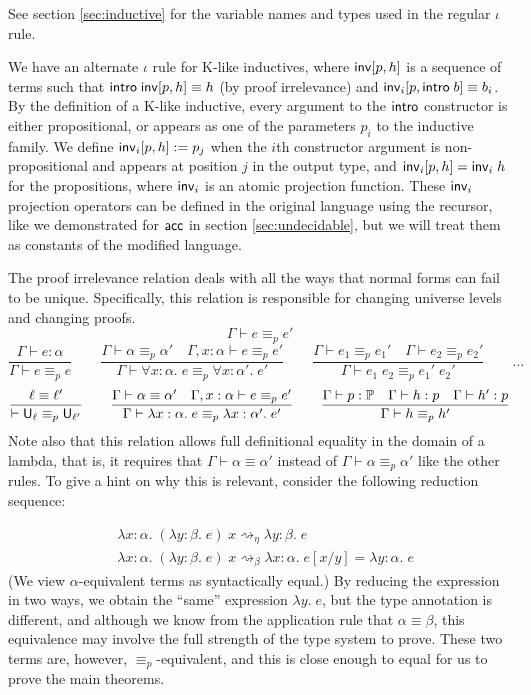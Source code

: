 See section \ref{sec:inductive} for the variable names and types used in the regular $\iota$ rule.

We have an alternate $\iota$ rule for K-like inductives, where $\mathsf{inv}[p,h]$ is a sequence of terms such that $\mathsf{intro}\;\mathsf{inv}[p,h]\equiv h$ (by proof irrelevance) and $\mathsf{inv}_i[p,\mathsf{intro}\;b]\equiv b_i$. By the definition of a K-like inductive, every argument to the $\mathsf{intro}$ constructor is either propositional, or appears as one of the parameters $p_i$ to the inductive family. We define $\mathsf{inv}_i[p,h]:=p_j$ when the $i$th constructor argument is non-propositional and appears at position $j$ in the output type, and $\mathsf{inv}_i[p,h]=\mathsf{inv}_i\;h$ for the propositions, where $\mathsf{inv}_i$ is an atomic projection function. These $\mathsf{inv}_i$ projection operators can be defined in the original language using the recursor, like we demonstrated for $\mathsf{acc}$ in section \ref{sec:undecidable}, but we will treat them as constants of the modified language.

The proof irrelevance relation deals with all the ways that normal forms can fail to be unique. Specifically, this relation is responsible for changing universe levels and changing proofs.
$$\boxed{\Gamma\vdash e\equiv_p e'}$$
$$\frac{\Gamma\vdash e:\alpha}{\Gamma\vdash e\equiv_p e}\qquad
\frac{\Gamma\vdash\alpha\equiv_p\alpha'\quad \Gamma,x:\alpha\vdash e\equiv_p e'}{\Gamma\vdash \forall x:\alpha.\;e\equiv_p \forall x:\alpha'.\;e'}\qquad
\frac{\Gamma\vdash e_1\equiv_p e_1'\quad \Gamma\vdash e_2\equiv_p e_2'}{\Gamma\vdash e_1\;e_2\equiv_p e_1'\;e_2'}\qquad\dots$$
$$\frac{\ell\equiv\ell'}{\vdash \U_\ell\equiv_p\U_{\ell'}}\qquad
\frac{\Gamma\vdash\alpha\equiv\alpha'\quad \Gamma,x:\alpha\vdash e\equiv_p e'}{\Gamma\vdash \lambda x:\alpha.\;e\equiv_p \lambda x:\alpha'.\;e'}\qquad
\frac{\Gamma\vdash p:\P\quad \Gamma\vdash h:p\quad \Gamma\vdash h':p}{\Gamma \vdash h\equiv_p h'}$$
Note also that this relation allows full definitional equality in the domain of a lambda, that is, it requires that $\Gamma\vdash \alpha\equiv\alpha'$ instead of $\Gamma\vdash \alpha\equiv_p\alpha'$ like the other rules. To give a hint on why this is relevant, consider the following reduction sequence:

\begin{align*}
&\lambda x:\alpha.\;(\lambda y:\beta.\;e)\;x\rightsquigarrow_\eta\lambda y:\beta.\;e\\
&\lambda x:\alpha.\;(\lambda y:\beta.\;e)\;x\rightsquigarrow_\beta\lambda x:\alpha.\;e[x/y]=\lambda y:\alpha.\;e
\end{align*}
(We view $\alpha$-equivalent terms as syntactically equal.) By reducing the expression in two ways, we obtain the ``same'' expression $\lambda y.\;e$, but the type annotation is different, and although we know from the application rule that $\alpha\equiv\beta$, this equivalence may involve the full strength of the type system to prove. These two terms are, however, $\equiv_p$-equivalent, and this is close enough to equal for us to prove the main theorems.

